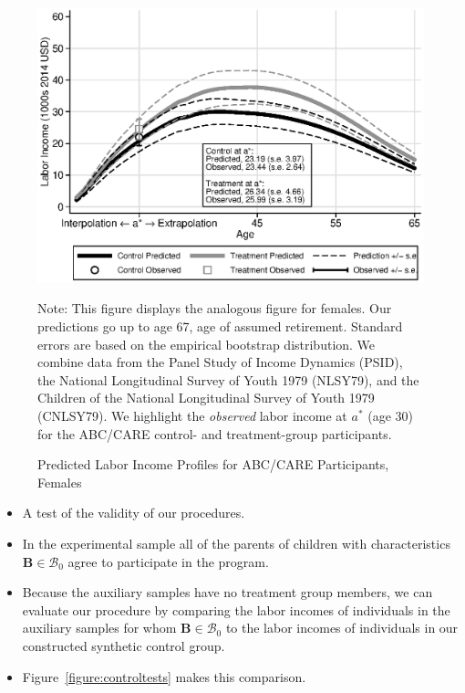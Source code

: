 \documentclass[static]{JJH-Beamer}
\begin{document}
\begin{frame}

\begin{figure}[H]\addtocounter{figure}{-1}
\caption{Predicted Labor Income Profiles for ABC/CARE Participants, Females}\label{fig:labor-income-profilesa}
\begin{center}
\includegraphics[width=.65\textwidth]{output/labor_25-65_pset1_mset3_female.eps}
\end{center}
\tiny \flushleft Note: This figure displays the analogous figure for females. Our predictions go up to age 67, age of assumed retirement. Standard errors are based on the empirical bootstrap distribution. We combine data from the Panel Study of Income Dynamics (PSID), the National Longitudinal Survey of Youth 1979 (NLSY79), and the Children of the National Longitudinal Survey of Youth 1979 (CNLSY79). We highlight the \textit{observed} labor income at $a^*$ (age 30) for the ABC/CARE control- and treatment-group participants.\\
\end{figure}

\end{frame}

\begin{frame}

\begin{itemize}
\item A test of the validity of our procedures.
\item In the experimental sample all of the parents of children with characteristics $\bm{B} \in \mathcal{B}_0$ agree to participate in the program.
\item Because the auxiliary samples have no treatment group members, we can evaluate our procedure by comparing the labor incomes of individuals in the auxiliary samples for whom $\bm{B} \in \mathcal{B}_0$ to the labor incomes of individuals in our constructed synthetic control group.
\item Figure~\ref{figure:controltests} makes this comparison.
\end{itemize}

\end{frame}
\end{document}
